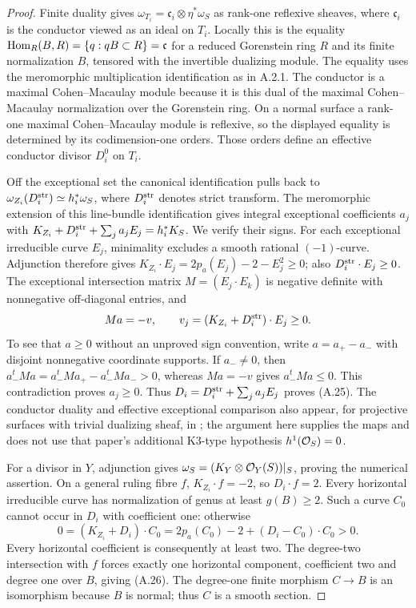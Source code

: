 \begin{proof}
Finite duality gives $\omega_{T_i}=\mathfrak c_i\otimes\eta^*\omega_S$ as rank-one reflexive sheaves, where $\mathfrak c_i$ is the conductor viewed as an ideal on $T_i$. Locally this is the equality
$\operatorname{Hom}_R(B,R)=\{q:qB\subset R\}=\mathfrak c$ for a reduced Gorenstein ring $R$ and its finite normalization $B$, tensored with the invertible dualizing module. The equality uses the meromorphic multiplication identification as in A.2.1. The conductor is a maximal Cohen--Macaulay module because it is this dual of the maximal Cohen--Macaulay normalization over the Gorenstein ring. On a normal surface a rank-one maximal Cohen--Macaulay module is reflexive, so the displayed equality is determined by its codimension-one orders. Those orders define an effective conductor divisor $D_i^0$ on $T_i$.

Off the exceptional set the canonical identification pulls back to $\omega_{Z_i}(D_i^{\rm str})\simeq h_i^*\omega_S$, where $D_i^{\rm str}$ denotes strict transform. The meromorphic extension of this line-bundle identification gives integral exceptional coefficients $a_j$ with
$K_{Z_i}+D_i^{\rm str}+\sum_j a_jE_j=h_i^*K_S$.
We verify their signs. For each exceptional irreducible curve $E_j$, minimality excludes a smooth rational $(-1)$-curve. Adjunction therefore gives
$K_{Z_i}\cdot E_j=2p_a(E_j)-2-E_j^2\ge0$;
also $D_i^{\rm str}\cdot E_j\ge0$. The exceptional intersection matrix $M=(E_j\cdot E_k)$ is negative definite with nonnegative off-diagonal entries, and
\[
 M a=-v,\qquad v_j=(K_{Z_i}+D_i^{\rm str})\cdot E_j\ge0.
\]
To see that $a\ge0$ without an unproved sign convention, write $a=a_+-a_-$ with disjoint nonnegative coordinate supports. If $a_-\ne0$, then
$a_-^tMa=a_-^tMa_+-a_-^tMa_->0$,
whereas $Ma=-v$ gives $a_-^tMa\le0$. This contradiction proves $a_j\ge0$. Thus $D_i=D_i^{\rm str}+\sum_j a_jE_j$ proves (A.25). The conductor duality and effective exceptional comparison also appear, for projective surfaces with trivial dualizing sheaf, in \cite[Lemma~1.1 and Corollary~1.4]{Furushima1993}; the argument here supplies the maps and does not use that paper's additional K3-type hypothesis $h^1(\mathcal O_S)=0$.

For a divisor in $Y$, adjunction gives $\omega_S=(K_Y\otimes\mathcal O_Y(S))|_S$, proving the numerical assertion. On a general ruling fibre $f$, $K_{Z_i}\cdot f=-2$, so $D_i\cdot f=2$. Every horizontal irreducible curve has normalization of genus at least $g(B)\ge2$. Such a curve $C_0$ cannot occur in $D_i$ with coefficient one: otherwise
\[
 0=(K_{Z_i}+D_i)\cdot C_0
   =2p_a(C_0)-2+(D_i-C_0)\cdot C_0>0.
\]
Every horizontal coefficient is consequently at least two. The degree-two intersection with $f$ forces exactly one horizontal component, coefficient two and degree one over $B$, giving (A.26). The degree-one finite morphism $C\to B$ is an isomorphism because $B$ is normal; thus $C$ is a smooth section.


\end{proof}
